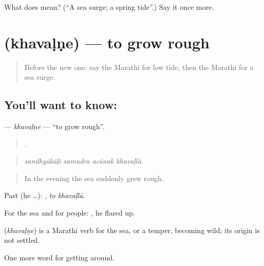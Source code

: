 \begin{tcolorbox}[breakable,colback=teal!4,colframe=teal!35!black,title={Before you move on}]
What does  mean? (\textquotedblleft{}A sea surge; a spring tide\textquotedblright{}.) Say it once more.
\end{tcolorbox}
\section[\texorpdfstring{\mr{खवळणे} (khavaḷṇe)}{खवळणे (khavaḷṇe)}]{ (khavaḷṇe) — to grow rough}

\label{lesson:MR-C409-khavalne}



\begin{quote}
Before the new one: say the Marathi for low tide, then the Marathi for a sea surge.
\end{quote}

\subsection*{You'll want to know: }
\textbf{} — \emph{khavaḷṇe} — \textquotedblleft{}to grow rough\textquotedblright{}.

\begin{quote}
   .
\end{quote}

\begin{quote}
\emph{sandhyākāḷī samudra acānak khavaḷlā.}
\end{quote}

\begin{quote}
In the evening the sea suddenly grew rough.
\end{quote}

Past (he …):  , \emph{to khavaḷlā}.

For the sea and for people:  , he flared up.

\begin{cousinweb}
\textbf{} (\emph{khavaḷṇe}) is a Marathi verb for the sea, or a temper, becoming wild; its origin is not settled.
\end{cousinweb}

\begin{grammarlens}[title={What you've built}]
One more word for getting around.
\end{grammarlens}

